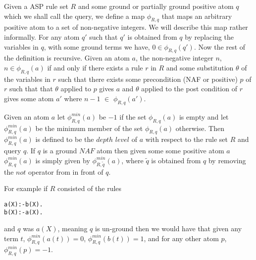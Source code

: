 \begin{definition}\label{depthlvl}
Given a ASP rule set $R$ and some ground or partially ground positive atom $q$ which we shall call the query, we define a map $\phi_{R,q}$ that maps an arbitrary positive atom to a set of non-negative integers. We
will describe this map rather informally. For any atom  $q'$ such that $q'$ is obtained from $q$ by replacing the variables in $q$, with some ground terms we have, $0\in
\phi_{R,q}(q')$. Now the rest of the definition is recursive. Given an atom $a$, the
non-negative integer $n$, $n\in \phi_{R,q}(a)$ if and only if there exists a rule
$r$ in $R$ and some substitution $\theta$ of the variables in $r$
such that there exists some precondition (NAF or positive) $p$ of $r$ such
that that $\theta$ applied to $p$ gives $a$ and $\theta$ applied to the post
condition of $r$ gives some atom $a'$ where $n-1$ $\in$ $\phi_{R,q}(a')$.

Given an atom $a$ let $\phi^{min}_{R,q}(a)$ be $-1$ if the set $\phi_{R,q}(a)$ is empty
and let $\phi^{min}_{R,q}(a)$ be the minimum member of the set $\phi_{R,q}(a)$
otherwise. Then $\phi^{min}_{R,q}(a)$ is defined to be the $depth$ $level$ of $a$
with respect to the rule set $R$ and query $q$. If $q$ is a ground $NAF$ atom then given some some positive atom $a$ $\phi^{min}_{R,q}(a)$ is simply given by $\phi^{min}_{R,\tilde{q}}(a)$, where $\tilde{q}$ is obtained from $q$ by removing the $not$ operator from in front of $q$.  
\end{definition}
For example if $R$ consisted of the rules
\begin{lstlisting}[frame=none]
a(X):-b(X).
b(X):-a(X).
\end{lstlisting} and $q$ was $a(X)$, meaning $q$ is un-ground then we would have that given any term $t$, $\phi_{R,q}^{min}(a(t)) = 0$, $\phi_{R,q}^{min}(b(t)) = 1$, and for any other atom $p$, $\phi_{R,q}^{min}(p) = -1$.  


